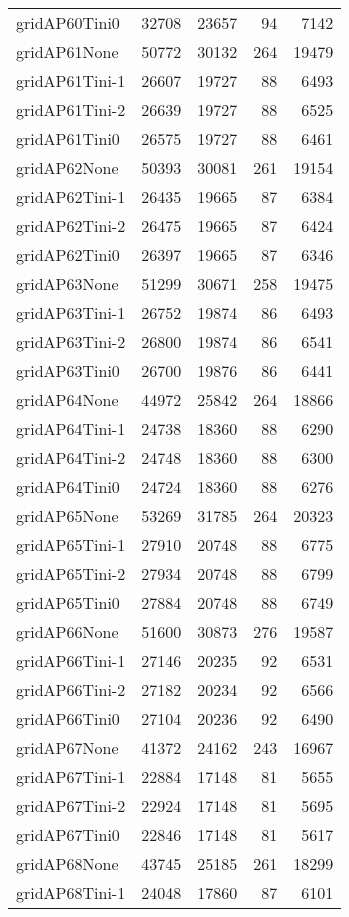 \begin{longtable}{lrrrr}
gridAP60Tini0 & 32708 & 23657 & 94 & 7142 \\
gridAP61None & 50772 & 30132 & 264 & 19479 \\
gridAP61Tini-1 & 26607 & 19727 & 88 & 6493 \\
gridAP61Tini-2 & 26639 & 19727 & 88 & 6525 \\
gridAP61Tini0 & 26575 & 19727 & 88 & 6461 \\
gridAP62None & 50393 & 30081 & 261 & 19154 \\
gridAP62Tini-1 & 26435 & 19665 & 87 & 6384 \\
gridAP62Tini-2 & 26475 & 19665 & 87 & 6424 \\
gridAP62Tini0 & 26397 & 19665 & 87 & 6346 \\
gridAP63None & 51299 & 30671 & 258 & 19475 \\
gridAP63Tini-1 & 26752 & 19874 & 86 & 6493 \\
gridAP63Tini-2 & 26800 & 19874 & 86 & 6541 \\
gridAP63Tini0 & 26700 & 19876 & 86 & 6441 \\
gridAP64None & 44972 & 25842 & 264 & 18866 \\
gridAP64Tini-1 & 24738 & 18360 & 88 & 6290 \\
gridAP64Tini-2 & 24748 & 18360 & 88 & 6300 \\
gridAP64Tini0 & 24724 & 18360 & 88 & 6276 \\
gridAP65None & 53269 & 31785 & 264 & 20323 \\
gridAP65Tini-1 & 27910 & 20748 & 88 & 6775 \\
gridAP65Tini-2 & 27934 & 20748 & 88 & 6799 \\
gridAP65Tini0 & 27884 & 20748 & 88 & 6749 \\
gridAP66None & 51600 & 30873 & 276 & 19587 \\
gridAP66Tini-1 & 27146 & 20235 & 92 & 6531 \\
gridAP66Tini-2 & 27182 & 20234 & 92 & 6566 \\
gridAP66Tini0 & 27104 & 20236 & 92 & 6490 \\
gridAP67None & 41372 & 24162 & 243 & 16967 \\
gridAP67Tini-1 & 22884 & 17148 & 81 & 5655 \\
gridAP67Tini-2 & 22924 & 17148 & 81 & 5695 \\
gridAP67Tini0 & 22846 & 17148 & 81 & 5617 \\
gridAP68None & 43745 & 25185 & 261 & 18299 \\
gridAP68Tini-1 & 24048 & 17860 & 87 & 6101 \\

\end{longtable}
